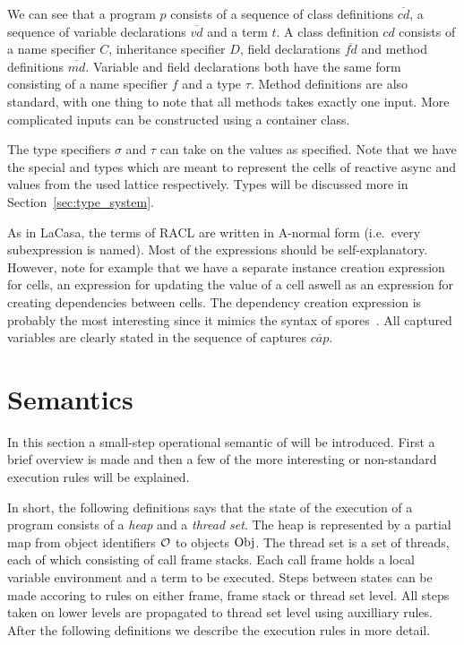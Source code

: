 We can see that a program $p$ consists of a sequence of class definitions
$\overline{cd}$, a sequence of variable declarations $\overline{vd}$ and a term
$t$. A class definition $cd$ consists of a name specifier $C$, inheritance
specifier $D$, field declarations $\overline{fd}$ and method definitions
$\overline{md}$. Variable and field declarations both have the same form
consisting of a name specifier $f$ and a type $\tau$. Method definitions are
also standard, with one thing to note that all methods takes exactly one input.
More complicated inputs can be constructed using a container class.

The type specifiers $\sigma$ and $\tau$ can take on the values as specified.
Note that we have the special \CellType{} and \LatType{} types which are meant
to represent the cells of reactive async and values from the used lattice
respectively. Types will be discussed more in Section~\ref{sec:type_system}.

As in LaCasa, the terms of RACL are written in A-normal form (i.e.\ every
subexpression is named). Most of the expressions should be self-explanatory.
However, note for example that we have a separate instance creation expression
for cells, an expression for updating the value of a cell aswell as an
expression for creating dependencies between cells. The dependency creation
expression is probably the most interesting since it mimics the syntax of
spores~\parencite{conf/ecoop/MillerHO14}. All captured variables are clearly
stated in the sequence of captures $\overline{cap}$. 

\section{Semantics}%
\label{sec:semantics}

In this section a small-step operational semantic of \RACL{} will be
introduced. First a brief overview is made and then a few of the more
interesting or non-standard execution rules will be explained.

In short, the following definitions says that the state of the execution of a
\RACL{} program consists of a \emph{heap} and a \emph{thread set}. The heap is
represented by a partial map from object identifiers $\mathcal{O}$ to objects
$\mathrm{Obj}$. The thread set is a set of threads, each of which consisting of call
frame stacks. Each call frame holds a local variable environment and a term to
be executed. Steps between states can be made accoring to rules on either frame,
frame stack or thread set level. All steps taken on lower levels are propagated
to thread set level using auxilliary rules. After the following definitions we
describe the execution rules in more detail.

